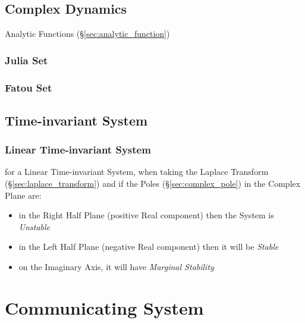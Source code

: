 \subsection{Complex Dynamics}\label{sec:complex_dynamics}

Analytic Functions (\S\ref{sec:analytic_function})



\subsubsection{Julia Set}\label{sec:julia_set}

\subsubsection{Fatou Set}\label{sec:fatou_set}



\subsection{Time-invariant System}\label{sec:time_invariant_system}

\subsubsection{Linear Time-invariant System}\label{sec:lti}

for a Linear Time-invariant System, when taking the Laplace Transform
(\S\ref{sec:laplace_transform}) and if the Poles (\S\ref{sec:complex_pole}) in
the Complex Plane are:
\begin{itemize}
  \item in the Right Half Plane (positive Real component) then the System is
    \emph{Unstable}
  \item in the Left Half Plane (negative Real component) then it will be
    \emph{Stable}
  \item on the Imaginary Axis, it will have \emph{Marginal Stability}
\end{itemize}



\section{Communicating System}\label{sec:communicating_system}


